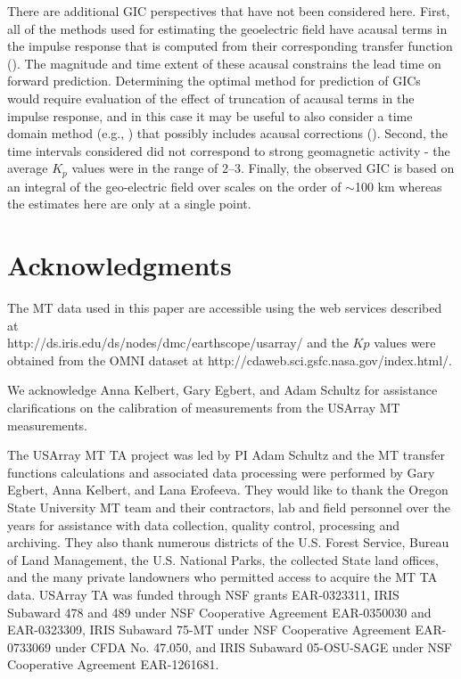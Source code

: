 \documentclass[12pt]{article}
\begin{document}
There are additional GIC perspectives that have not been considered here.  First, all of the methods used for estimating the geoelectric field have acausal terms in the impulse response that is computed from their corresponding transfer function (\cite{Egbert1992}).  The magnitude and time extent of these acausal constrains the lead time on forward prediction.  Determining the optimal method for prediction of GICs would require evaluation of the effect of truncation of acausal terms in the impulse response, and in this case it may be useful to also consider a time domain method (e.g., \cite{McMechan1985}) that possibly includes acausal corrections (\cite{Tzschoppe2009}).  Second, the time intervals considered did not correspond to strong geomagnetic activity - the average $K_p$ values were in the range of 2--3.  Finally, the observed GIC is based on an integral of the geo-electric field over scales on the order of $\sim$100 km whereas the estimates here are only at a single point.

\section{Acknowledgments}

The MT data used in this paper are accessible using the web services described at \\http://ds.iris.edu/ds/nodes/dmc/earthscope/usarray/ and the $Kp$ values were obtained from the OMNI dataset at http://cdaweb.sci.gsfc.nasa.gov/index.html/.

We acknowledge Anna Kelbert, Gary Egbert, and Adam Schultz for assistance clarifications on the calibration of measurements from the USArray MT measurements.

The USArray MT TA project was led by PI Adam Schultz and the MT transfer functions calculations and associated data processing were performed by Gary Egbert, Anna Kelbert, and Lana Erofeeva.  They would like to thank the Oregon State University MT team and their contractors, lab and field personnel over the years for assistance with data collection, quality control, processing and archiving. They also thank numerous districts of the U.S. Forest Service, Bureau of Land Management, the U.S. National Parks, the collected State land offices, and the many private landowners who permitted access to acquire the MT TA data. USArray TA was funded through NSF grants EAR-0323311, IRIS Subaward 478 and 489 under NSF Cooperative Agreement EAR-0350030 and EAR-0323309, IRIS Subaward 75-MT under NSF Cooperative Agreement EAR-0733069 under CFDA No. 47.050, and IRIS Subaward 05-OSU-SAGE under NSF Cooperative Agreement EAR-1261681.
\end{document}
